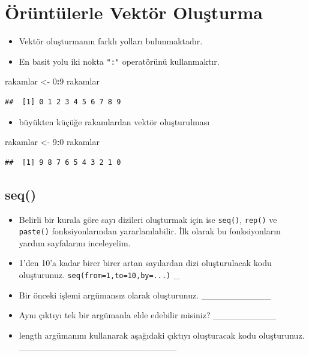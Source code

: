 \documentclass[
  oneside]{book}
\newenvironment{Shaded}{\begin{snugshade}}{\end{snugshade}}
\newcommand{\DecValTok}[1]{\textcolor[rgb]{0.00,0.00,0.81}{#1}}
\newcommand{\NormalTok}[1]{#1}
\newcommand{\OtherTok}[1]{\textcolor[rgb]{0.56,0.35,0.01}{#1}}
\newcommand{\SpecialCharTok}[1]{\textcolor[rgb]{0.81,0.36,0.00}{\textbf{#1}}}
\providecommand{\tightlist}{%
  \setlength{\itemsep}{0pt}\setlength{\parskip}{0pt}}
\begin{document}
\hypertarget{uxf6ruxfcntuxfclerle-vektuxf6r-oluux15fturma}{%
\section{Örüntülerle Vektör Oluşturma}\label{uxf6ruxfcntuxfclerle-vektuxf6r-oluux15fturma}}

\begin{itemize}
\item
  Vektör oluşturmanın farklı yolları bulunmaktadır.
\item
  En basit yolu iki nokta \texttt{":"} operatörünü kullanmaktır.
\end{itemize}

\begin{Shaded}
\begin{Highlighting}[]
\NormalTok{rakamlar }\OtherTok{\textless{}{-}} \DecValTok{0}\SpecialCharTok{:}\DecValTok{9}
\NormalTok{rakamlar}
\end{Highlighting}
\end{Shaded}

\begin{verbatim}
##  [1] 0 1 2 3 4 5 6 7 8 9
\end{verbatim}

\begin{itemize}
\tightlist
\item
  büyükten küçüğe rakamlardan vektör oluşturulması
\end{itemize}

\begin{Shaded}
\begin{Highlighting}[]
\NormalTok{rakamlar }\OtherTok{\textless{}{-}} \DecValTok{9}\SpecialCharTok{:}\DecValTok{0}
\NormalTok{rakamlar}
\end{Highlighting}
\end{Shaded}

\begin{verbatim}
##  [1] 9 8 7 6 5 4 3 2 1 0
\end{verbatim}

\hypertarget{seq}{%
\subsection{seq()}\label{seq}}

\begin{itemize}
\item
  Belirli bir kurala göre sayı dizileri oluşturmak için ise \texttt{seq()}, \texttt{rep()} ve \texttt{paste()} fonksiyonlarından yararlanılabilir. İlk olarak bu fonksiyonların yardım sayfalarını inceleyelim.
\item
  1'den 10'a kadar birer birer artan sayılardan dizi oluşturulacak kodu oluşturunuz. \texttt{seq(from=1,to=10,by=...)} \_
\item
  Bir önceki işlemi argümansız olarak oluşturunuz. \_\_\_\_\_\_\_\_\_\_\_
\item
  Aynı çıktıyı tek bir argümanla elde edebilir misiniz? \_\_\_\_\_\_\_\_\_\_
\item
  length argümanını kullanarak aşağıdaki çıktıyı oluşturacak kodu oluşturunuz. \_\_\_\_\_\_\_\_\_\_\_\_\_\_\_\_\_\_\_\_\_\_\_\_\_
\end{itemize}
\end{document}
